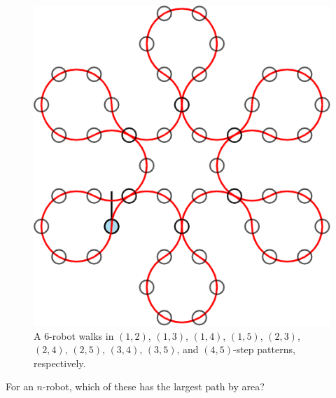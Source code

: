 \documentclass{article}
\begin{document}
\begin{figure}[ht!]
  \includegraphics[scale=0.12]{assets/robot_walks/079_problem_6-robot_4_5.png}
  \caption{
    A $6$-robot walks in $(1,2)$, $(1,3)$, $(1,4)$, $(1,5)$, $(2,3)$,
    $(2,4)$, $(2,5)$, $(3,4)$, $(3,5)$, and $(4,5)$-step patterns, respectively.
  }
\end{figure}
\begin{question}
  For an $n$-robot, which of these has the largest path by area?
\end{question}
\end{document}
